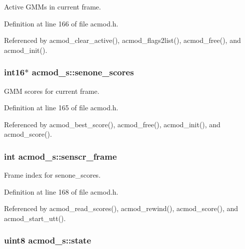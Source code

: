 Active G\+M\+Ms in current frame. 



Definition at line 166 of file acmod.\+h.



Referenced by acmod\+\_\+clear\+\_\+active(), acmod\+\_\+flags2list(), acmod\+\_\+free(), and acmod\+\_\+init().

\subsubsection[{senone\+\_\+scores}]{\setlength{\rightskip}{0pt plus 5cm}int16$\ast$ acmod\+\_\+s\+::senone\+\_\+scores}\label{structacmod__s_aa341539b98a5b13bef8589fc8d948da8}


G\+M\+M scores for current frame. 



Definition at line 165 of file acmod.\+h.



Referenced by acmod\+\_\+best\+\_\+score(), acmod\+\_\+free(), acmod\+\_\+init(), and acmod\+\_\+score().

\subsubsection[{senscr\+\_\+frame}]{\setlength{\rightskip}{0pt plus 5cm}int acmod\+\_\+s\+::senscr\+\_\+frame}\label{structacmod__s_ab70ba4caf96b656936d499247e921f00}


Frame index for senone\+\_\+scores. 



Definition at line 168 of file acmod.\+h.



Referenced by acmod\+\_\+read\+\_\+scores(), acmod\+\_\+rewind(), acmod\+\_\+score(), and acmod\+\_\+start\+\_\+utt().

\subsubsection[{state}]{\setlength{\rightskip}{0pt plus 5cm}uint8 acmod\+\_\+s\+::state}\label{structacmod__s_a06adf606c11e6f4b9869742510a5c23b}


